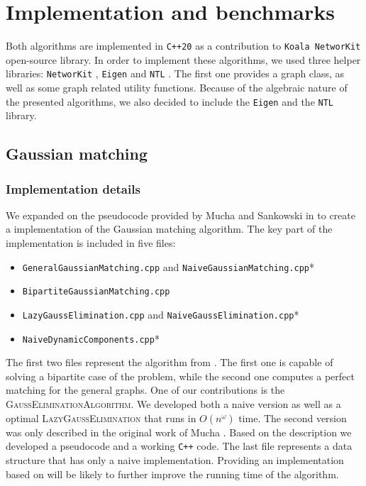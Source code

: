 \chapter{Implementation and benchmarks}

Both algorithms are implemented in \texttt{C++20} as a contribution to \texttt{Koala NetworKit} \cite{koala_networkit} open-source library. In order to implement these algorithms, we used three helper libraries: \texttt{NetworKit} \cite{networkit}, \texttt{Eigen} \cite{eigen} and \texttt{NTL} \cite{ntl}. The first one provides a graph class, as well as some graph related utility functions. Because of the algebraic nature of the presented algorithms, we also decided to include the \texttt{Eigen} and the \texttt{NTL} library.

\section{Gaussian matching}
\subsection{Implementation details}
We expanded on the pseudocode provided by Mucha and Sankowski in \cite{mucha} to create a implementation of the Gaussian matching algorithm. The key part of the implementation is included in five files:
\begin{itemize}
    \item \texttt{GeneralGaussianMatching.cpp} and \texttt{NaiveGaussianMatching.cpp}*
    \item \texttt{BipartiteGaussianMatching.cpp}
    \item \texttt{LazyGaussElimination.cpp} and \texttt{NaiveGaussElimination.cpp}*
    \item \texttt{NaiveDynamicComponents.cpp}*
\end{itemize}

The first two files represent the algorithm from \cite{mucha}. The first one is capable of solving a bipartite case of the problem, while the second one computes a perfect matching for the general graphs. One of our contributions is the \textsc{GaussEliminationAlgorithm}. We developed both a naive version as well as a optimal \textsc{LazyGaussElimination} that runs in $O(n^\omega)$ time. The second version was only described in the original work of Mucha \cite{mucha}. Based on the description we developed a pseudocode and a working \texttt{C++} code.
The last file represents a data structure that has only a naive implementation. Providing an implementation based on \cite{dynamic_components} will be likely to further improve the running time of the algorithm. 

